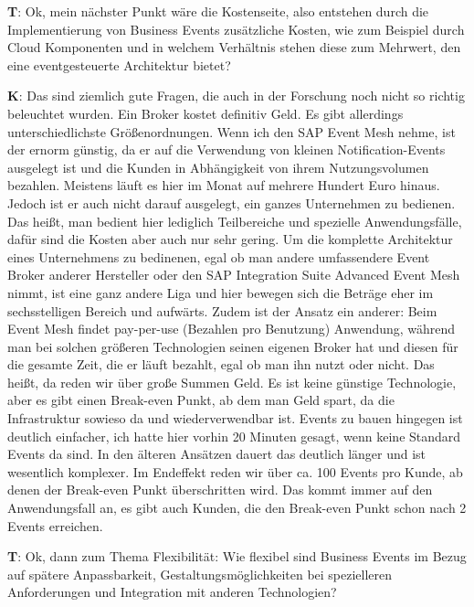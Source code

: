 \begin{list}{X:}{\setlength{\labelsep}{5mm}}
    \item[\textbf{T}:] Ok, mein nächster Punkt wäre die Kostenseite, also entstehen durch die Implementierung von Business Events zusätzliche Kosten, wie zum Beispiel durch Cloud Komponenten und in welchem Verhältnis stehen diese zum Mehrwert, den eine eventgesteuerte Architektur bietet?
    \item[\textbf{K}:] Das sind ziemlich gute Fragen, die auch in der Forschung noch nicht so richtig beleuchtet wurden. Ein Broker kostet definitiv Geld. Es gibt allerdings unterschiedlichste Grö{\ss}enordnungen. Wenn ich den SAP Event Mesh nehme, ist der ernorm günstig, da er auf die Verwendung von kleinen Notification-Events ausgelegt ist und die Kunden in Abhängigkeit von ihrem Nutzungsvolumen bezahlen. Meistens läuft es hier im Monat auf mehrere Hundert Euro hinaus. Jedoch ist er auch nicht darauf ausgelegt, ein ganzes Unternehmen zu bedienen. Das hei{\ss}t, man bedient hier lediglich Teilbereiche und spezielle Anwendungsfälle, dafür sind die Kosten aber auch nur sehr gering. Um die komplette Architektur eines Unternehmens zu bedinenen, egal ob man andere umfassendere Event Broker anderer Hersteller oder den SAP Integration Suite Advanced Event Mesh nimmt, ist eine ganz andere Liga und hier bewegen sich die Beträge eher im sechsstelligen Bereich und aufwärts. Zudem ist der Ansatz ein anderer: Beim Event Mesh findet pay-per-use (Bezahlen pro Benutzung) Anwendung, während man bei solchen grö{\ss}eren Technologien seinen eigenen Broker hat und diesen für die gesamte Zeit, die er läuft bezahlt, egal ob man ihn nutzt oder nicht. Das hei{\ss}t, da reden wir über gro{\ss}e Summen Geld. Es ist keine günstige Technologie, aber es gibt einen Break-even Punkt, ab dem man Geld spart, da die Infrastruktur sowieso da und wiederverwendbar ist. Events zu bauen hingegen ist deutlich einfacher, ich hatte hier vorhin 20 Minuten gesagt, wenn keine Standard Events da sind. In den älteren Ansätzen dauert das deutlich länger und ist wesentlich komplexer. Im Endeffekt reden wir über ca. 100 Events pro Kunde, ab denen der Break-even Punkt überschritten wird. Das kommt immer auf den Anwendungsfall an, es gibt auch Kunden, die den Break-even Punkt schon nach 2 Events erreichen.
    \item[\textbf{T}:] Ok, dann zum Thema Flexibilität: Wie flexibel sind Business Events im Bezug auf spätere Anpassbarkeit, Gestaltungsmöglichkeiten bei spezielleren Anforderungen und Integration mit anderen Technologien?

\end{list}
